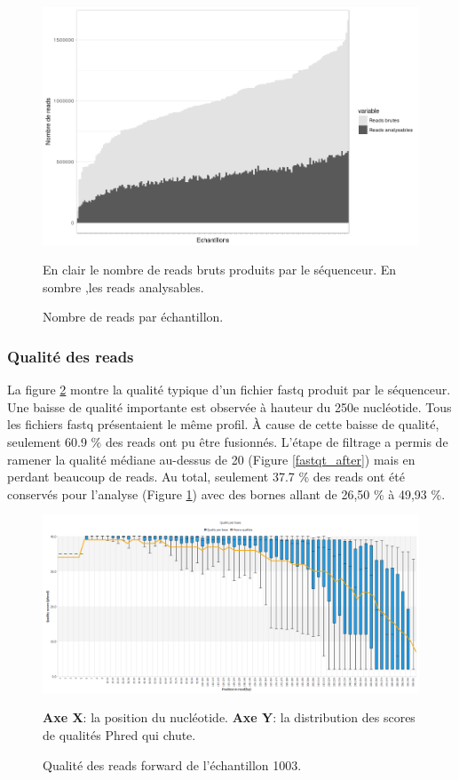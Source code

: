 \documentclass[12pt,a4paper]{article}
\begin{document}
\begin{figure}[H]
\begin{center}
\includegraphics[scale=0.5]{img/pipeline.png}\hfill
\caption{Nombre de reads par échantillon.}
En clair le nombre de reads bruts produits par le séquenceur. En sombre ,les reads analysables.
\label{readcount}

\end{center}
\end{figure}


\subsubsection{Qualité des reads}
La figure \ref{fastqt} montre la qualité typique d'un fichier fastq produit par le séquenceur. Une baisse de qualité importante est observée à hauteur du 250e nucléotide. Tous les fichiers fastq présentaient le même profil.
À cause de cette baisse de qualité, seulement 60.9 \% des reads ont pu être fusionnés.
L'étape de filtrage a permis de ramener la qualité médiane au-dessus de 20 (Figure \ref{fastqt_after}) mais en perdant beaucoup de reads.
Au total, seulement 37.7 \% des reads ont été conservés pour l'analyse (Figure \ref{readcount}) avec des bornes allant de 26,50 \% à 49,93 \%.


\begin{figure}[H]
\begin{center}
\includegraphics[scale=0.4]{img/1003_forward.png}\hfill
\caption{Qualité des reads forward de l'échantillon 1003.} \textbf{Axe X}: la position du nucléotide. \textbf{Axe Y}: la distribution des scores de qualités Phred qui chute.
\label{fastqt}
\end{center}
\end{figure}
\end{document}
